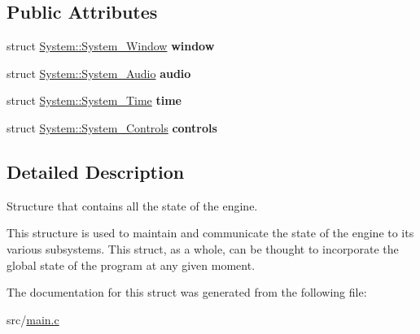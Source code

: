 \subsection*{Public Attributes}
\begin{DoxyCompactItemize}
\item 
\mbox{\label{structSystem_afc7cab795c94d32a178c71e63efa3909}} 
struct \mbox{\hyperlink{structSystem_1_1System__Window}{System\+::\+System\+\_\+\+Window}} {\bfseries window}
\item 
\mbox{\label{structSystem_a6cf27a71a33b3e122fc0331e882ca55c}} 
struct \mbox{\hyperlink{structSystem_1_1System__Audio}{System\+::\+System\+\_\+\+Audio}} {\bfseries audio}
\item 
\mbox{\label{structSystem_a838bde0b870a57cb981d298d8d31b8d7}} 
struct \mbox{\hyperlink{structSystem_1_1System__Time}{System\+::\+System\+\_\+\+Time}} {\bfseries time}
\item 
\mbox{\label{structSystem_adcdd3b325a13a23dba64d3fa5ffd9fbe}} 
struct \mbox{\hyperlink{structSystem_1_1System__Controls}{System\+::\+System\+\_\+\+Controls}} {\bfseries controls}
\end{DoxyCompactItemize}


\subsection{Detailed Description}
Structure that contains all the state of the engine. 

This structure is used to maintain and communicate the state of the engine to its various subsystems. This struct, as a whole, can be thought to incorporate the global state of the program at any given moment. 

The documentation for this struct was generated from the following file\+:\begin{DoxyCompactItemize}
\item 
src/\mbox{\hyperlink{main_8c}{main.\+c}}\end{DoxyCompactItemize}
